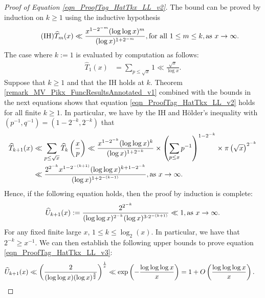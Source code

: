 \documentclass[11pt,reqno,a4letter]{article}
\newcommand{\hlocalref}[1]{\hyperref[#1]{\ref{#1}}}
\numberwithin{equation}{section}
\numberwithin{figure}{section}
\numberwithin{table}{section}
\theoremstyle{plain}
\numberwithin{theorem}{section}
\theoremstyle{definition}
\theoremstyle{remark}
\newcommand{\mathtext}[1]{\text{\rm #1}}
\begin{document}
\begin{proof}[Proof of Equation \eqref{eqn_ProofTag_HatTkx_LL_v2}]
The bound can be proved by induction on $k \geq 1$ using the inductive hypothesis
\[
\tag{IH}
\widehat{T}_m(x) \ll \frac{x^{1-2^{-m}} (\log\log x)^{m}}{(\log x)^{1+2^{-m}}}, 
	\mathtext{ for all } 1 \leq m \leq k, 
	\mathtext{ as } x \rightarrow \infty. 
\] 
The case where $k := 1$ is evaluated by computation as follows: 
\begin{align*}
\widehat{T}_1(x) & = \sum_{p \leq \sqrt{x}} 1 \ll \frac{\sqrt{x}}{\log x}. 
\end{align*}
Suppose that $k \geq 1$ and that the IH holds at $k$. 
Theorem \hlocalref{remark_MV_Pikx_FuncResultsAnnotated_v1} 
combined with the bounds in the next equations shows that 
equation \eqref{eqn_ProofTag_HatTkx_LL_v2} holds for all finite $k \geq 1$.
In particular, we have by the IH and 
H\"older's inequality with $\left(p^{-1}, q^{-1}\right) = \left(1-2^{-k}, 2^{-k}\right)$ that 
\begin{align*}
\widehat{T}_{k+1}(x) & \ll \sum_{p \leq \sqrt{x}} \widehat{T}_{k}\left(\frac{x}{p}\right) 
     \ll \frac{x^{1-2^{-k}} (\log\log x)^{k}}{(\log x)^{1+2^{-k}}} \times 
	\left(\sum_{p \leq x} p^{-1}\right)^{1-2^{-k}} \times 
	\pi\left(\sqrt{x}\right)^{2^{-k}} \\ 
     & \ll \frac{2^{2^{-k}} x^{1-2^{-(k+1)}} (\log\log x)^{k+1-2^{-k}}}{(\log x)^{1+2^{-(k-1)}}} ,
	\mathtext{ as } x \rightarrow \infty. 
\end{align*}
Hence, if the following equation holds, then the proof by induction is complete:
\begin{equation}
\label{eqn_ProofTag_HatTkx_LL_v3}
\widehat{U}_{k+1}(x) := \frac{2^{2^{-k}}}{(\log\log x)^{2^{-k}} (\log x)^{3 \cdot 2^{-(k+1)}}} \ll 1, 
     \mathtext{ as } x \rightarrow \infty. 
\end{equation}
For any fixed finite large $x$, $1 \leq k \leq \log_2(x)$. 
In particular, we have that $2^{-k} \geq x^{-1}$. 
We can then establish the following upper bounds to prove 
equation \eqref{eqn_ProofTag_HatTkx_LL_v3}: 
\begin{align*}
\widehat{U}_{k+1}(x) & \ll \left(\frac{2}{(\log\log x) (\log x)^{\frac{3}{2}}}\right)^{\frac{1}{x}} 
     \ll \exp\left(-\frac{\log\log\log x}{x}\right) = 1 + O\left(\frac{\log\log\log x}{x}\right). 
     \qedhere
\end{align*}
\end{proof}
\end{document}
